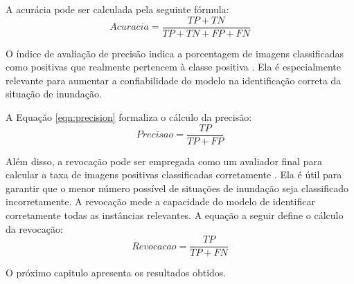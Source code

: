 A acurácia pode ser calculada pela seguinte fórmula:
\begin{equation}
    \label{eqn:accuracy}
    Acuracia = \frac{TP+TN}{TP+TN+FP+FN}
\end{equation}

O índice de avaliação de precisão indica a porcentagem de imagens classificadas como positivas que realmente pertencem à classe positiva \cite{FAWCETT2006861}. 
Ela é especialmente relevante para aumentar a confiabilidade do modelo na identificação correta da situação de inundação.

A Equação \ref{eqn:precision} formaliza o cálculo da precisão:
\begin{equation}
    \label{eqn:precision}
    Precisao = \frac{TP}{TP+FP}
\end{equation}

Além disso, a revocação pode ser empregada como um avaliador final para calcular a taxa de imagens positivas classificadas corretamente \cite{MurphyProbabilistic}. 
Ela é útil para garantir que o menor número possível de situações de inundação seja classificado incorretamente. A revocação mede a capacidade do modelo de identificar corretamente todas as instâncias relevantes.
A equação a seguir define o cálculo da revocação:
\begin{equation}
    \label{eqn:recall}
    Revocacao = \frac{TP}{TP+FN}
\end{equation}

O próximo capitulo apresenta os resultados obtidos. 